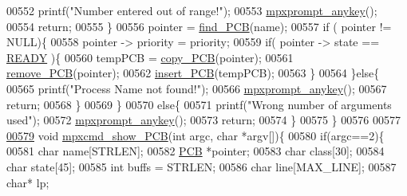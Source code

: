 \begin{DoxyCode}
{{00552                         printf(\textcolor{stringliteral}{"Number entered out of range!"});
00553                         \hyperlink{mpx__util_8c_a338d01dfe3c80732c00450203c85b964}{mpxprompt_anykey}();
00554                         \textcolor{keywordflow}{return};
00555                 \}
00556                 pointer = \hyperlink{mpx__r2_8c_a612a6abcb66c688a32f33abc93ff3990}{find_PCB}(name);
00557                 \textcolor{keywordflow}{if} ( pointer != NULL)\{
00558                         pointer -> priority = priority;
00559                         \textcolor{keywordflow}{if}( pointer -> state == \hyperlink{mpx__r2_8h_ad1235d5ce36f7267285e82dccd428aa6}{READY} )\{
00560                                         tempPCB = \hyperlink{mpx__r2_8c_aca3ad02d2b4c68f7653b0adf2c484ff6}{copy_PCB}(pointer);
00561                                         \hyperlink{mpx__r2_8c_af30a3658210d449b4b53e5be2ed2bc2e}{remove_PCB}(pointer);
00562                                         \hyperlink{mpx__r2_8c_aa3b334e3a5afd6e590917667ad359a6f}{insert_PCB}(tempPCB);
00563                                         \}
00564                 \}\textcolor{keywordflow}{else}\{
00565                         printf(\textcolor{stringliteral}{"Process Name not found!"});
00566                         \hyperlink{mpx__util_8c_a338d01dfe3c80732c00450203c85b964}{mpxprompt_anykey}();
00567                         \textcolor{keywordflow}{return};
00568                 \}
00569         \}
00570         \textcolor{keywordflow}{else}\{
00571                 printf(\textcolor{stringliteral}{"Wrong number of arguments used"});
00572                 \hyperlink{mpx__util_8c_a338d01dfe3c80732c00450203c85b964}{mpxprompt_anykey}();
00573                 \textcolor{keywordflow}{return};
00574         \}
00575 \}
00576 
00577 
\hypertarget{mpx__r2_8c_source_l00579}{}\hyperlink{mpx__r2_8h_ae52d77243725636a3b23d05235fee141}{00579} \textcolor{keywordtype}{void} \hyperlink{mpx__r2_8c_ae52d77243725636a3b23d05235fee141}{mpxcmd_show_PCB}(\textcolor{keywordtype}{int} argc, \textcolor{keywordtype}{char} *argv[])\{
00580         \textcolor{keywordflow}{if}(argc==2)\{
00581                 \textcolor{keywordtype}{char} name[STRLEN];
00582                 \hyperlink{structprocess}{PCB} *pointer;
00583                 \textcolor{keywordtype}{char} \textcolor{keyword}{class}[30];
00584                 \textcolor{keywordtype}{char} state[45];
00585                 \textcolor{keywordtype}{int} buffs = STRLEN;
00586                 \textcolor{keywordtype}{char} line[MAX\_LINE];
00587                 \textcolor{keywordtype}{char}* lp;
}}
\end{DoxyCode}
